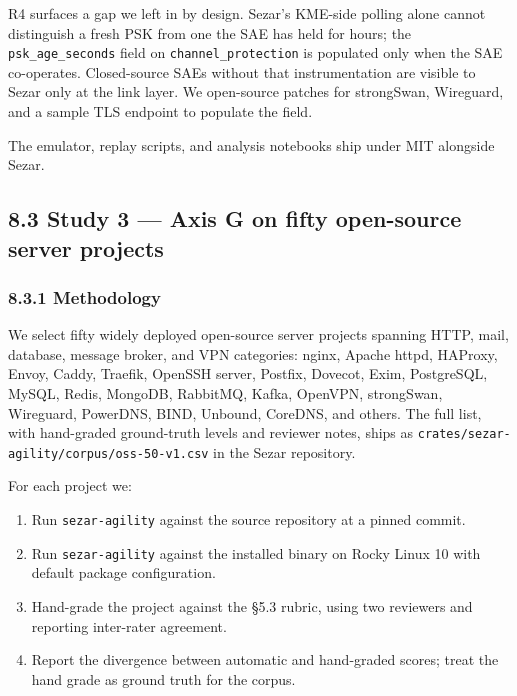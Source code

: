 R4 surfaces a gap we left in by design. Sezar's KME-side polling alone
cannot distinguish a fresh PSK from one the SAE has held for hours; the
\texttt{psk\_age\_seconds} field on \texttt{channel\_protection} is
populated only when the SAE co-operates. Closed-source SAEs without that
instrumentation are visible to Sezar only at the link layer. We
open-source patches for strongSwan, Wireguard, and a sample TLS endpoint
to populate the field.

The emulator, replay scripts, and analysis notebooks ship under MIT
alongside Sezar.

\subsection{8.3 Study 3 --- Axis G on fifty open-source server
projects}\label{study-3-axis-g-on-fifty-open-source-server-projects}

\subsubsection{8.3.1 Methodology}\label{methodology-2}

We select fifty widely deployed open-source server projects spanning
HTTP, mail, database, message broker, and VPN categories: nginx, Apache
httpd, HAProxy, Envoy, Caddy, Traefik, OpenSSH server, Postfix, Dovecot,
Exim, PostgreSQL, MySQL, Redis, MongoDB, RabbitMQ, Kafka, OpenVPN,
strongSwan, Wireguard, PowerDNS, BIND, Unbound, CoreDNS, and others. The
full list, with hand-graded ground-truth levels and reviewer notes,
ships as \texttt{crates/sezar-agility/corpus/oss-50-v1.csv} in the Sezar
repository.

For each project we:

\begin{enumerate}
\def\labelenumi{\arabic{enumi}.}
\tightlist
\item
  Run \texttt{sezar-agility} against the source repository at a pinned
  commit.
\item
  Run \texttt{sezar-agility} against the installed binary on Rocky Linux
  10 with default package configuration.
\item
  Hand-grade the project against the §5.3 rubric, using two reviewers
  and reporting inter-rater agreement.
\item
  Report the divergence between automatic and hand-graded scores; treat
  the hand grade as ground truth for the corpus.
\end{enumerate}

